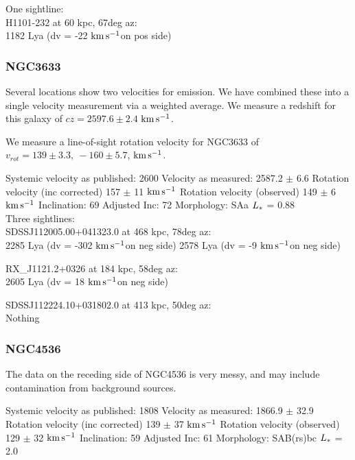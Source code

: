 \documentclass[iop]{emulateapj-rtx4}
\newcommand{\kms}{$\rm km\, s^{-1}$}
\begin{document}
One sightline: \\
H1101-232 at 60 kpc, 67deg az: \\
1182 Lya (dv = -22 \kms on pos side)


\subsubsection{NGC3633}
Several locations show two velocities for emission. We have combined these into a single velocity measurement via a weighted average. We measure a redshift for this galaxy of $cz = 2597.6 \pm 2.4$ \kms.

We measure a line-of-sight rotation velocity for NGC3633 of $v_{rot}=139\pm 3.3,~-160\pm5.7$,  \kms.


Systemic velocity as published: 2600
Velocity as measured: 2587.2 $\pm$ 6.6
Rotation velocity (inc corrected) 157 $\pm$ 11 \kms
Rotation velocity (observed) 149 $\pm$ 6 \kms
Inclination: 69
Adjusted Inc: 72
Morphology: SAa
$L_{\**}$ = 0.88 \\

Three sightlines: \\
SDSSJ112005.00+041323.0 at 468 kpc, 78deg az: \\
2285 Lya (dv = -302 \kms on neg side)
2578 Lya (dv = -9 \kms on neg side)


RX\_J1121.2+0326 at 184 kpc, 58deg az: \\
2605 Lya (dv = 18 \kms on neg side)


SDSSJ112224.10+031802.0 at 413 kpc, 50deg az: \\
Nothing


\subsubsection{NGC4536}
The data on the receding side of NGC4536 is very messy, and may include contamination from background sources. 



Systemic velocity as published: 1808
Velocity as measured: 1866.9 $\pm$ 32.9
Rotation velocity (inc corrected) 139 $\pm$ 37 \kms
Rotation velocity (observed) 129 $\pm$ 32 \kms
Inclination: 59
Adjusted Inc: 61
Morphology: SAB(rs)bc
$L_{\**}$ = 2.0 \\
\end{document}

